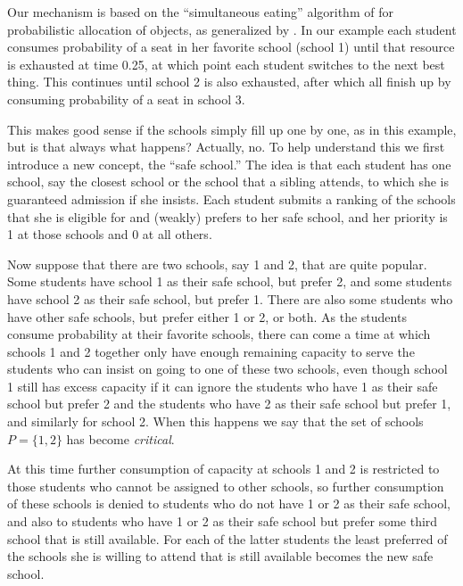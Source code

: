 \documentclass[12pt]{article}
\theoremstyle{definition}
\begin{document}
\smallskip
Our mechanism is based on the ``simultaneous eating'' algorithm of
\cite{bm01} for probabilistic allocation of objects, as generalized by
\cite{balbuzanov22jet}.  In our example each student consumes
probability of a seat in her favorite school (school 1) until that
resource is exhausted at time 0.25, at which point each student
switches to the next best thing.  This continues until school 2 is
also exhausted, after which all finish up by consuming probability of
a seat in school 3.

This makes good sense if the schools simply fill up one by one, as in
this example, but is that always what happens?  Actually, no.  To help
understand this we first introduce a new concept, the ``safe school.''
The idea is that each student has one school, say the closest school
or the school that a sibling attends, to which she is guaranteed
admission if she insists.  Each student submits a ranking of the
schools that she is eligible for and (weakly) prefers to her safe
school, and her priority is 1 at those schools and 0 at all others.

Now suppose that there are two schools, say 1 and 2, that are quite
popular.  Some students have school 1 as their safe school, but prefer
2, and some students have school 2 as their safe school, but prefer 1.
There are also some students who have other safe schools, but prefer
either 1 or 2, or both.  As the students consume probability at their
favorite schools, there can come a time at which schools 1 and 2
together only have enough remaining capacity to serve the students who
can insist on going to one of these two schools, even though school 1
still has excess capacity if it can ignore the students who have 1 as
their safe school but prefer 2 and the students who have 2 as their
safe school but prefer 1, and similarly for school 2.  When this
happens we say that the set of schools $P = \{1,2\}$ has become
\emph{critical}.

At this time further consumption of capacity at schools 1 and 2 is
restricted to those students who cannot be assigned to other schools,
so further consumption of these schools is denied to students who do
not have 1 or 2 as their safe school, and also to students who have 1
or 2 as their safe school but prefer some third school that is still
available.  For each of the latter students the least preferred of the
schools she is willing to attend that is still available becomes the
new safe school.
\end{document}
